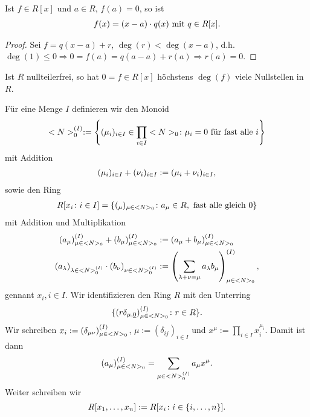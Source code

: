 \begin{conclusion}
	Ist $f \in R[x]$ und $a \in R$, $f(a) = 0$, so ist
	\begin{align}
		f(x) = (x-a)\cdot q(x) \text{ mit } q \in R[x]. \notag
	\end{align}
\end{conclusion}

\begin{proof}
	Sei $f = q(x-a) + r$, $\deg(r) < \deg(x-a)$, d.h. $\deg(1) \leq 0 \Rightarrow 0 = f(a) = q(a-a) + r(a) \Rightarrow r(a) = 0$.
\end{proof}

\begin{conclusion}
	Ist $R$ nullteilerfrei, so hat $0 = f \in R[x]$ höchstens $\deg(f)$ viele Nullstellen in $R$.
\end{conclusion}

\begin{definition}
	Für eine Menge $I$ definieren wir den Monoid
	\begin{align}
	<N>_{0}^{(I)} : = \left\{ (\mu_i)_{i \in I} \in \prod_{i \in I} <N>_{0} \colon \mu_i = 0 \text{ für fast alle } i \right\}\notag
	\end{align}
	mit Addition
	\begin{align}
		(\mu_i)_{i \in I} + (\nu_i)_{i \in I} :=(\mu_i+\nu_i)_{i \in I}, \notag
	\end{align}
	sowie den Ring
	\begin{align}
		R[x_i \colon i \in I] = \{ (_{\mu})_{\mu \in <N>_{0}} \colon a_{\mu} \in R, \text{ fast alle gleich } 0\} \notag
	\end{align}
	mit Addition und Multiplikation
	\begin{align}
		(a_{\mu})_{\mu \in <N>_{0}}^{(I)} + (b_{\mu})_{\mu \in <N>_{0}}^{(I)} &:= (a_{\mu} + b_{\mu})_{\mu \in <N>_{0}}^{(I)}\notag \\
		(a_{\lambda})_{\lambda \in <N>_{0}^{(I)}}\cdot (b_{\nu})_{\nu \in <N>_{0}^{(I)}} &:= \left( \sum_{\lambda + \nu = \mu} a_{\lambda}b_{\mu}\right)_{\mu \in <N>_{0}}^{(I)}, \notag
	\end{align}
	gennant  $x_i, i \in I$. Wir identifizieren den Ring $R$ mit den Unterring
	\begin{align}
		\{ (r\delta_{\mu,\underline{0}})_{\mu \in <N>_{0}}^{(I)}\colon r \in R \}. \notag
	\end{align}
	Wir schreiben $x_i := (\delta_{\mu\nu})_{\mu \in <N>_{0}}^{(I)}$, $\mu := (\delta_{ij})_{i \in I}$ und $x^{\mu} := \prod_{i \in I}x_i^{\mu_i}$. Damit ist dann
	\begin{align}
		(a_{\mu})_{\mu \in <N>_{0}}^{(I)} = \sum_{\mu \in <N>_{0}^{(I)}} a_{\mu} x^{\mu}. \notag
	\end{align}
	Weiter schreiben wir
	\begin{align}
		R[x_1, \dots, x_n] := R[x_i \colon i \in \{ i, \dots, n \}]. \notag
	\end{align}
\end{definition}

